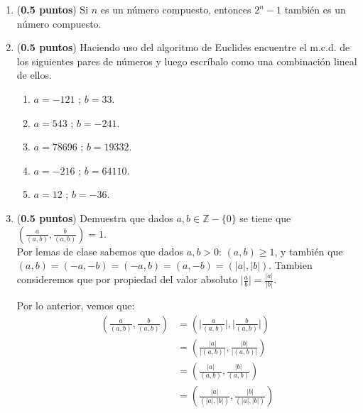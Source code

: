 \documentclass[fontsize=12pt]{scrartcl}
\providecommand{\abs}[1]{\lvert#1\rvert}
\begin{document}
\begin{enumerate}
                        
		
		\item ({\bf 0.5 puntos}) Si $n$ es un n\'umero compuesto, entonces 
		$2^{n} - 1$ tambi\'en es un n\'umero compuesto.
		

	
		\item ({\bf 0.5 puntos}) Haciendo uso del algoritmo de Euclides encuentre 
		el m.c.d. de los siguientes pares de n\'umeros y luego escr\'ibalo 
		como una combinaci\'on lineal de ellos.
			\begin{enumerate}
				\item $a = -121$ ; $b = 33$.
				\item $a = 543$ ; $b = -241 $.
				\item $a = 78696$ ; $b = 19332$.
				\item $a = -216$ ; $b = 64110$.
				\item $a = 12$ ; $b = -36$.
			\end{enumerate}

	   	 \item ({\bf 0.5 puntos})  Demuestra que dados $a, b \in \mathbb{Z}-\{0\}$ 
		   se tiene que $\left( \frac{a}{(a,b)}, \frac{b}{(a,b)} \right ) = 1$. \\
                   Por lemas de clase sabemos que dados $a, b >0$: $(a,b) \geq 1$, y también que $(a, b) = (-a, -b) = (-a, b) = (a,-b) = ( \abs{a}, \abs{b})$. Tambien consideremos que por propiedad del valor absoluto $ \abs {\frac{a}{b}} = \frac{\abs{a}}{\abs{b}}$.

                   Por lo anterior, vemos que:
                  \begin{equation*}
                    \begin{split}
                      \left( \frac{a}{(a,b)}, \frac{b}{(a,b)} \right) &= \left(\abs{\frac{a}{(a,b)}},\abs{\frac{b}{(a,b)}}\right) \\
                      &= \left( \frac{\abs {a} } { \abs {(a,b) } } ,\frac{\abs{b}}{\abs{(a,b)}} \right)   \\
                      &= \left( \frac{\abs {a} } { (a,b)  } ,\frac{\abs{b}}{(a,b)} \right) \\
                      &= \left( \frac{\abs {a} } { (\abs{a},\abs{b})  }, \frac{\abs{b}}{(\abs{a},\abs{b})} \right) \\
                    \end{split}
                  \end{equation*}


\end{enumerate}
\end{document}
